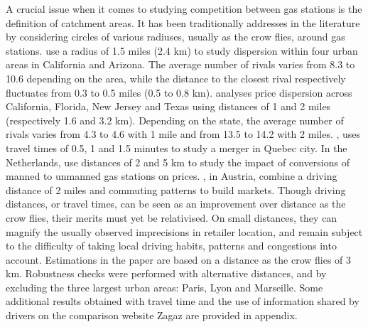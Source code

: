 \documentclass[english]{article}
\begin{document}
A crucial issue when it comes to studying competition between gas stations is the definition of catchment areas. It has been traditionally addresses in the literature by considering circles of various radiuses, usually as the crow flies, around gas stations. \cite{BAR04} use a radius of 1.5 miles (2.4 km) to study dispersion within four urban areas in California and Arizona. The average number of rivals varies from 8.3 to 10.6 depending on the area, while the distance to the closest rival respectively fluctuates from 0.3 to 0.5 miles (0.5 to 0.8 km). \cite{TAP11} analyses price dispersion across California, Florida, New Jersey and Texas using distances of 1 and 2 miles (respectively 1.6 and 3.2 km). Depending on the state, the average number of rivals varies from 4.3 to 4.6 with 1 mile and from 13.5 to 14.2 with 2 miles. \cite{HOU12}, uses travel times of 0.5, 1 and 1.5 minutes to study a merger in Quebec city. In the Netherlands, \cite{BRU15} use distances of 2 and 5 km to study the impact of conversions of manned to unmanned gas stations on prices. \cite{PEN15}, in Austria, combine a driving distance of 2 miles and commuting patterns to build markets. Though driving distances, or travel times, can be seen as an improvement over distance as the crow flies, their merits must yet be relativised. On small distances, they can magnify the usually observed imprecisions in retailer location, and remain subject to the difficulty of taking local driving habits, patterns and congestions into account. Estimations in the paper are based on a distance as the crow flies of 3 km. Robustness checks were performed with alternative distances, and by excluding the three largest urban areas: Paris, Lyon and Marseille. Some additional results obtained with travel time and the use of information shared by drivers on the comparison website Zagaz are provided in appendix.
\end{document}
